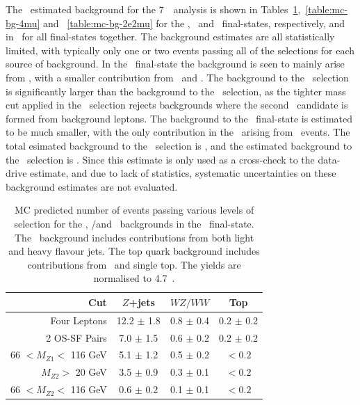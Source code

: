 The \mc\ estimated background for the 7~\tev\ analysis is shown
in Tables~\ref{table:mc-bg-4e},~\ref{table:mc-bg-4mu} and
~\ref{table:mc-bg-2e2mu} for the \eeee, \mmmm\ and \eemm\ final-states,
respectively, and in~ for all final-states together. The
background estimates are all statistically limited, with typically only one or
two events passing all of the selections for each source of background. In the \eeee\ final-state the
background is seen to mainly arise from \Zjets, with a smaller contribution from
\WZ\ and \WW. The background to the \ZZs\ selection is significantly larger than
the background to the \ZZ\ selection, as the tighter mass cut applied in the
\ZZ\ selection rejects backgrounds where the second \Z\ candidate is formed from
background leptons. The background to the \mmmm\ final-state is estimated to be much smaller, with the only contribution in the \mc\ arising
from \WZ\ events. The total esimated background to the \ZZs\ selection is
, and the estimated background to the \ZZ\ selection
is . Since this estimate is only used as a
cross-check to the data-drive estimate, and due to lack of statistics,
systematic uncertainties on these background estimates are not evaluated.

\begin{table}[htbp]
  \centering
  \begin{tabular}{r|c|c|c} 
    \hline\hline
                 Cut &               $Z$+jets &             $WZ/WW$ &               Top\\ 
    \hline
        Four Leptons        &  12.2 $\pm$ 1.8 & 0.8 $\pm$ 0.4 & 0.2 $\pm$ 0.2 \\ 
       2 OS-SF Pairs        &  7.0  $\pm$ 1.5 & 0.6 $\pm$ 0.2 & 0.2 $\pm$ 0.2 \\ 
66 $ < M_{Z1} < $ 116 GeV   &  5.1  $\pm$ 1.2 & 0.5 $\pm$ 0.2 & $<0.2$ \\ 
  $M_{Z2} > $ 20 GeV        &  3.5  $\pm$ 0.9 & 0.3 $\pm$ 0.1 & $<0.2$ \\ 
66 $ < M_{Z2} < $ 116 GeV   &  0.6  $\pm$ 0.2 & 0.1 $\pm$ 0.1 & $<0.2$ \\ 
    \hline\hline
  \end{tabular}
  \caption[MC predicted number of events passing various levels of selection for
  the \Zjets, \WZ/\WW and \topquark\ backgrounds in the \eeee\ final-state.]
  {MC predicted number of events passing various levels of selection for
  the \Zjets, \WZ/\WW and \topquark\ backgrounds in the \eeee\ final-state. The
  \Zjets\ background includes contributions from both light and heavy flavour
  jets. The top quark background includes contributions from \ttbar\ and
  single top. The yields are normalised to 4.7~\ifb.
  }
  \label{table:mc-bg-4e}
\end{table}

